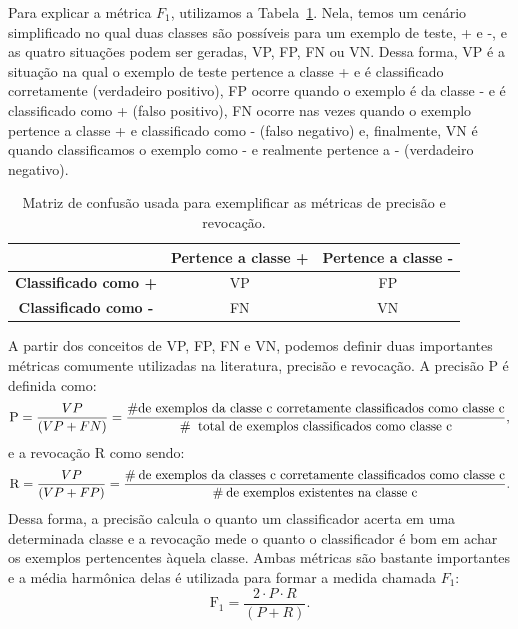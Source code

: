 



Para explicar a métrica $F_1$, utilizamos a Tabela~\ref{table::confusao}. Nela, temos um cenário simplificado no qual duas classes são possíveis para um exemplo de teste, + e -, e as quatro situações podem ser geradas, VP, FP, FN ou VN. Dessa forma, VP é a situação na qual o exemplo de teste pertence a classe + e é classificado corretamente (verdadeiro positivo), FP ocorre quando o exemplo é da classe - e é classificado como + (falso positivo), FN ocorre nas vezes quando o exemplo pertence a classe + e classificado como - (falso negativo) e, finalmente, VN é quando classificamos o exemplo como - e realmente pertence a - (verdadeiro negativo).


\begin{table}[ht*]
\centering
\caption{Matriz de confusão usada para exemplificar as métricas de precisão e revocação.}
\begin{tabular}{|c||c|c|}
\toprule
       &    \textbf{Pertence a classe +} & \textbf{Pertence a classe -} \\
\midrule
\hline
    \textbf{Classificado como +}  & VP & FP \tabularnewline \hline
    \textbf{Classificado como -}  & FN & VN \tabularnewline
\bottomrule
\end{tabular}
\label{table::confusao}
\end{table}

A partir dos conceitos de VP, FP, FN e VN, podemos definir duas importantes métricas comumente utilizadas na literatura, precisão e revocação. A precisão \textsc{P} é definida como:
\begin{equation}
\textsc{P} = \frac{VP}{(VP+FN)} = \frac{\# \text{de exemplos da classe c corretamente classificados como classe c}} {\# \: \text{ total de exemplos classificados como classe c}} \\,
\end{equation}
e a revocação \textsc{R} como sendo:
\begin{equation}
\textsc{R} = \frac{VP}{(VP+FP)} = \frac{\# \: \text{de exemplos da classes c corretamente classificados como classe c}}{\# \: \text{de exemplos existentes na classe c}}.
\end{equation}
Dessa forma, a precisão calcula o quanto um classificador acerta em uma determinada classe e a revocação mede o quanto o classificador é bom em achar os exemplos pertencentes àquela classe.
Ambas métricas são bastante importantes e a média harmônica delas é utilizada para formar a medida chamada $F_1$:
\begin{equation}
\text{F}_1 = \frac{2 \cdot P \cdot R}{(P + R)}.
\end{equation}

